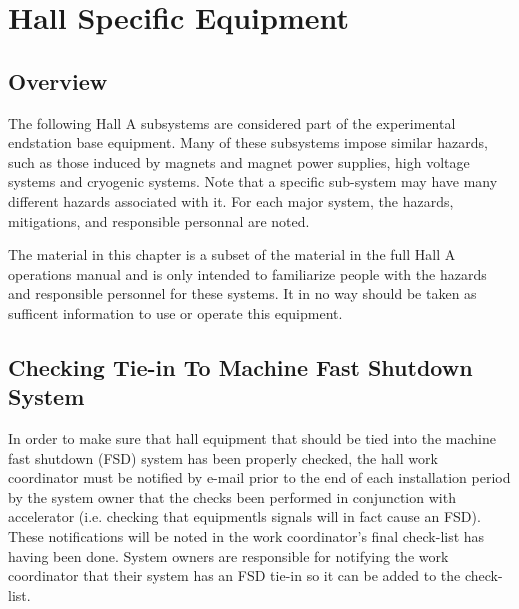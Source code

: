 %
%
\chapter{Hall Specific Equipment}

\section{Overview}

        The following Hall A subsystems are considered part of the experimental endstation base equipment.
Many of these subsystems impose similar hazards, such as those induced by magnets and magnet power supplies,
high voltage systems and cryogenic systems.  Note that a specific sub-system may have many different hazards associated with it.
For each major system, the hazards, mitigations, and responsible personnal are noted.

The material in this chapter is a subset of the material in the full Hall A operations manual and is only intended to familiarize
people with the hazards and responsible personnel for these systems.  It in no way should be taken as sufficent information to
use or operate this equipment.

\section{Checking Tie-in To Machine Fast Shutdown System}

In order to make sure that hall equipment that should be tied into the machine fast shutdown (FSD) system
has been properly checked, the hall work coordinator must be notified by e-mail prior to the end of each
installation period by the system owner
that the checks been performed in conjunction with accelerator (i.e. checking that equipmentls signals
will in fact cause an FSD).  These notifications will be
noted in the work coordinator's final check-list has having been done.   System owners are responsible
for notifying the work coordinator that their system has an FSD tie-in so it can be added to the check-list.


%
%

